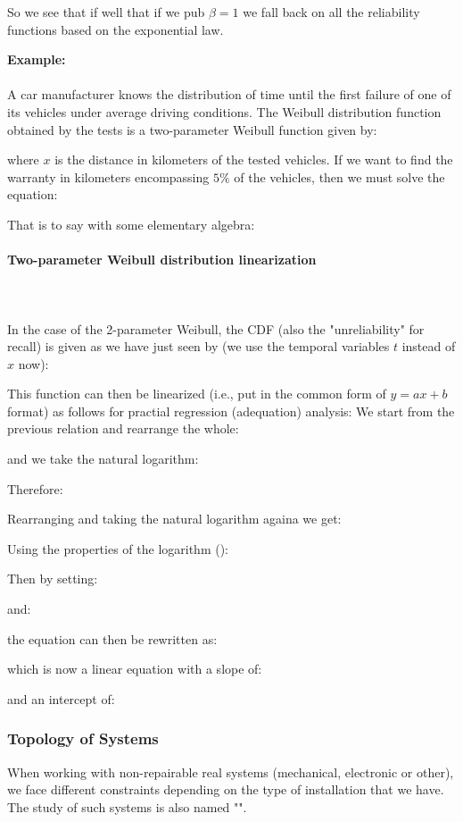 	So we see that if well that if we pub $\beta=1$ we fall back on all the reliability functions based on the exponential law.
	\begin{tcolorbox}[colframe=black,colback=white,sharp corners]
	\textbf{{\Large {}}Example:}\\\\
	A car manufacturer knows the distribution of time until the first failure of one of its vehicles under average driving conditions. The Weibull distribution function obtained by the tests is a two-parameter Weibull function given by:
	
	where $x$ is the distance in kilometers of the tested vehicles.	
	If we want to find the warranty in kilometers encompassing $5\%$ of the vehicles, then we must solve the equation:
	
	That is to say with some elementary algebra:
	
	\end{tcolorbox}
	
	\paragraph{Two-parameter Weibull distribution linearization}\mbox{}\\\\
	In the case of the 2-parameter Weibull, the CDF (also the "unreliability" for recall) is given as we have just seen by (we use the temporal variables $t$ instead of $x$ now):
	
 	This function can then be linearized (i.e., put in the common form of $y=ax+b$ format) as follows for practial regression (adequation) analysis:
 	We start from the previous relation and rearrange the whole:
	
 	and we take the natural logarithm:
	
 	Therefore:
	
	Rearranging and taking the natural logarithm againa we get:
	
	Using the properties of the logarithm ():
	
	Then by setting:
	
	and:
	
	the equation can then be rewritten as:
 	
	which is now a linear equation with a slope of:
	
	and an intercept of:
	
	
	\pagebreak
	\subsubsection{Topology of Systems}
	When working with non-repairable real systems (mechanical, electronic or other), we face different constraints depending on the type of installation that we have. The study of such systems is also named "".
	
